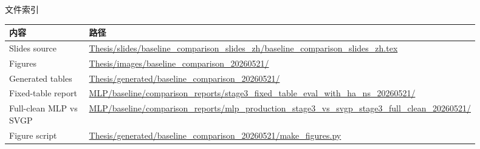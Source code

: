 \documentclass[aspectratio=169,11pt]{beamer}
\newcommand{\pathtext}[1]{{\scriptsize\url{#1}}}
\begin{document}
\begin{frame}{文件索引}
\small
\begin{tabular}{L{0.30\linewidth}L{0.60\linewidth}}
\toprule
内容 & 路径 \\
\midrule
Slides source & \pathtext{Thesis/slides/baseline_comparison_slides_zh/baseline_comparison_slides_zh.tex} \\
Figures & \pathtext{Thesis/images/baseline_comparison_20260521/} \\
Generated tables & \pathtext{Thesis/generated/baseline_comparison_20260521/} \\
Fixed-table report & \pathtext{MLP/baseline/comparison_reports/stage3_fixed_table_eval_with_ha_ns_20260521/} \\
Full-clean MLP vs SVGP & \pathtext{MLP/baseline/comparison_reports/mlp_production_stage3_vs_svgp_stage3_full_clean_20260521/} \\
Figure script & \pathtext{Thesis/generated/baseline_comparison_20260521/make_figures.py} \\
\bottomrule
\end{tabular}
\end{frame}
\end{document}
